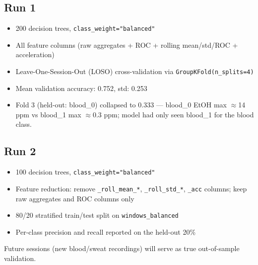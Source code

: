 \documentclass[11pt,a4paper]{article}
\begin{document}
\subsection{Run 1}
\begin{itemize}
  \item 200 decision trees, \texttt{class\_weight="balanced"}
  \item All feature columns (raw aggregates + ROC + rolling mean/std/ROC + acceleration)
  \item Leave-One-Session-Out (LOSO) cross-validation via \texttt{GroupKFold(n\_splits=4)}
  \item Mean validation accuracy: 0.752, std: 0.253
  \item Fold 3 (held-out: blood\_0) collapsed to 0.333 --- blood\_0 EtOH max
        $\approx$14 ppm vs blood\_1 max $\approx$0.3 ppm; model had only seen blood\_1 for
        the blood class.
\end{itemize}

\subsection{Run 2}
\begin{itemize}
  \item 100 decision trees, \texttt{class\_weight="balanced"}
  \item Feature reduction: remove \texttt{\_roll\_mean\_*}, \texttt{\_roll\_std\_*},
        \texttt{\_acc} columns; keep raw aggregates and ROC columns only
  \item 80/20 stratified train/test split on \texttt{windows\_balanced}
  \item Per-class precision and recall reported on the held-out 20\%
\end{itemize}

Future sessions (new blood/sweat recordings) will serve as true out-of-sample
validation.
\end{document}

